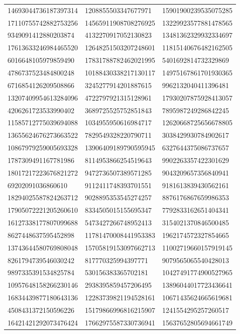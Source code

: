 \begin{longtable}{*{3}{l}}
14693044736187397314&1208855503347677971&15901900239535075285\\
17110755742882753256&14565911908708276925&13229923577881478565\\
9349091412880203874&4132270917052130823&13481362329932334697\\
17613633246984465520&12648251503207248601&11815140676482162505\\
6016648105979859490&17831788782462021995&5401692814732329869\\
4786737523484800248&10188430338217130117&14975167861701930365\\
6716854126209508866&3245277914201887615&9962132040411396481\\
13207409954613284096&4722797921315128961&17930207875928413057\\
4206261723533990402&3689725525752851843&7895987249286842245\\
11585712775039694088&1034955950616984717&12620668725656678805\\
13655624676273663522&7829549328220790711&3038429930784902617\\
10867979259005693328&13906409189790595945&6327644375086737657\\
1787309491167781986&8114953866254519643&9902263357422301629\\
18017217223676821272&9472736507389571285&9043209657356840941\\
69202091036860610&9112411748393701551&9181613839430562161\\
18294025587824263712&9028895353545274257&8876176867659986353\\
17905072221205260610&8334505015155695347&7792833162651404341\\
16127338177807099688&5473427266748952413&3154021370846500485\\
8627448637595452898&11781470008441953383&1962174572327854665\\
13743644580769808048&15705819153097662713&11002719660157919145\\
8261794739546030242&817770325994397771&9079565065540428013\\
9897335391534825784&530156383365702181&10427491774900527965\\
10957648158266230146&2938395859457206495&13896044017723436641\\
16834439877180643136&12283739821194528161&10671435624665619681\\
4508431372150596226&15179866996816215907&1241554295257260517\\
16421421292073476424&17662975587330736941&15637652805694661749\\

\end{longtable}
